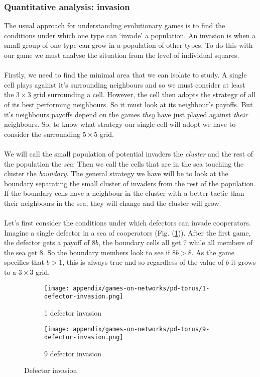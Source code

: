 \subsubsection{Quantitative analysis: invasion}
The usual approach for understanding evolutionary games is to find the conditions under which one type can `invade' a population. An invasion is when a small group of one type can grow in a population of other types. To do this with our game we must analyse the situation from the level of individual squares.\\
\\
Firstly, we need to find the minimal area that we can isolate to study. A single cell plays against it's surrounding neighbours and so we must consider at least the $3\times3$ grid surrounding a cell. However, the cell then adopts the strategy of all of its best performing neighbours. So it must look at its neighbour's payoffs. But it's neighbours payoffs depend on the games \textit{they} have just played against \textit{their} neighbours. So, to know what strategy our single cell will adopt we have to consider the surrounding $5\times5$ grid\cite{eq_of_life}.\\
\\
We will call the small population of potential invaders the \textit{cluster} and the rest of the population the \textit{sea}. Then we call the cells that are in the sea touching the cluster the \textit{boundary}. The general strategy we have will be to look at the boundary separating the small cluster of invaders from the rest of the population. If the boundary cells have a neighbour in the cluster with a better tactic than their neighbours in the sea, they will change and the cluster will grow.\\
\\
Let's first consider the conditions under which defectors can invade cooperators. Imagine a single defector in a sea of cooperators (Fig. (\ref{fig:1-d-i})). After the first game, the defector gets a payoff of $8b$, the boundary cells all get $7$ while all members of the sea get $8$. So the boundary members look to see if $8b>8$. As the game specifies that $b>1$, this is always true and so regardless of the value of $b$ it grows to a $3\times3$ grid.
\begin{figure}
	\centering
	\begin{subfigure}{.49\textwidth}
		\centering
		\texttt{[image: appendix/games-on-networks/pd-torus/1-defector-invasion.png]}
		\caption{1 defector invasion}
		\label{fig:1-d-i}
	\end{subfigure}%
	\begin{subfigure}{.49\textwidth}
		\centering
		\texttt{[image: appendix/games-on-networks/pd-torus/9-defector-invasion.png]}
		\caption{9 defector invasion}
		\label{fig:9-d-i}
	\end{subfigure}
	\caption{Defector invasion}
	\label{}
\end{figure}\\
